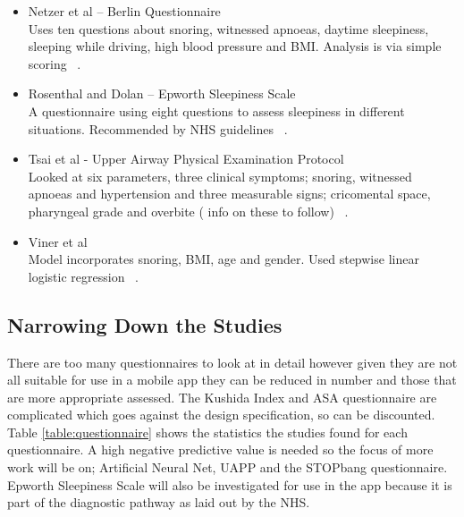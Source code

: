 \begin{itemize}
\item Netzer et al – Berlin Questionnaire \\
Uses ten questions about snoring, witnessed apnoeas, daytime sleepiness, sleeping while driving, high blood pressure and BMI. Analysis is via simple scoring ~\cite{netzer1999using}.
\item Rosenthal and Dolan – Epworth Sleepiness Scale \\
A questionnaire using eight questions to assess sleepiness in different situations. Recommended by NHS guidelines ~\cite{rosenthal2008epworth}.
\item Tsai et al - Upper Airway Physical Examination Protocol \\
Looked at six parameters, three clinical symptoms; snoring, witnessed apnoeas and hypertension and three measurable signs; cricomental space, pharyngeal grade and overbite ( info on these to follow) ~\cite{tsai2003decision}.
\item Viner et al\\ 
Model incorporates snoring, BMI, age and gender. Used stepwise linear logistic regression ~\cite{viner1991history}.
\end{itemize}

\subsection{Narrowing Down the Studies}
There are too many questionnaires to look at in detail however given they are not all suitable for use in a mobile app they can be reduced in number and those that are more appropriate assessed. The Kushida Index and ASA questionnaire are complicated which goes against the design specification, so can be discounted. Table \ref{table:questionnaire} shows the statistics the studies found for each questionnaire. A high negative predictive value is needed so the focus of more work will be on; Artificial Neural Net, UAPP and the STOPbang questionnaire. Epworth Sleepiness Scale will also be investigated for use in the app because it is part of the diagnostic pathway as laid out by the NHS.

